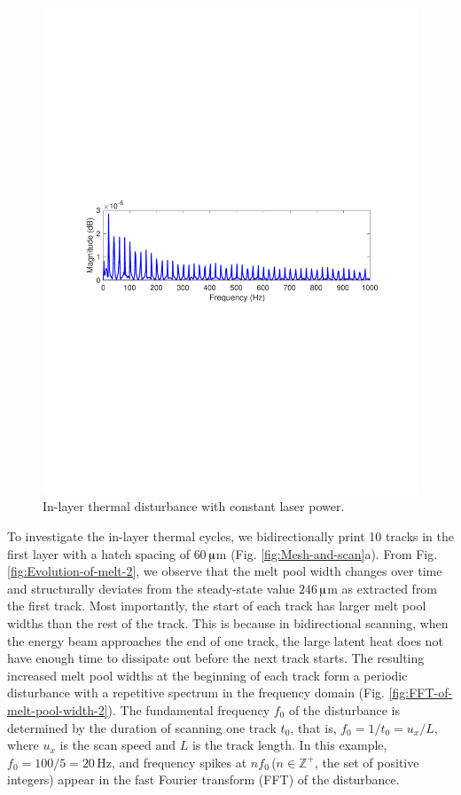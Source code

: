 \documentclass [11pt, proquest] {uwthesis}[2020/02/24]
\begin{document}
\begin{figure}[!ht]
\begin{centering}
{\begin{centering}
\includegraphics[clip,width=12cm]{Closed-loop-simulation/mpw_straight_cnstq_freq_onefig_2}
\par\end{centering}
}
\par\end{centering}
\centering{}\caption{\label{fig:In-layer-melt-pool-1}In-layer thermal disturbance with
constant laser power.}
\end{figure}
To investigate the in-layer thermal cycles, we bidirectionally print
10 tracks in the first layer with a hatch spacing of $60\,$$\muup$m
(Fig. \ref{fig:Mesh-and-scan}a). From Fig. \ref{fig:Evolution-of-melt-2}, we observe that the melt pool
width changes over time and structurally deviates from the steady-state
value $246\,$$\muup$m as extracted from the first track. Most importantly,
the start of each track has larger melt pool widths than the rest
of the track. This is because in bidirectional scanning, when the
energy beam approaches the end of one track, the large latent heat
does not have enough time to dissipate out before the next track starts.
The resulting increased melt pool widths at the beginning of each
track form a periodic disturbance with a repetitive spectrum in the
frequency domain (Fig. \ref{fig:FFT-of-melt-pool-width-2}). The fundamental
frequency $f_{0}$ of the disturbance is determined by the duration
of scanning one track $t_{0}$, that is, $f_{0}=1/t_{0}=u_{x}/L$,
where $u_{x}$ is the scan speed and $L$ is the track length. In
this example, $f_{0}=100/5=20\,\text{Hz}$, and frequency spikes at
${nf_{0}}\,$($n\in\mathbb{Z}^{+}$, the set of positive integers)
appear in the fast Fourier transform (FFT) of the disturbance.
\end{document}
